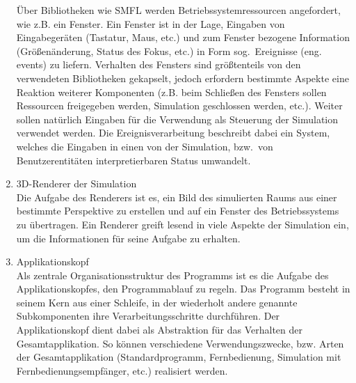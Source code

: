 \documentclass[11pt,twoside,a4paper]{article}
\begin{document}
\begin{enumerate}
Über Bibliotheken wie SMFL \cite{sfml} werden Betriebssystemressourcen angefordert, wie z.B. ein Fenster. Ein Fenster ist in der Lage, Eingaben von Eingabegeräten (Tastatur, Maus, etc.) und zum Fenster bezogene Information (Größenänderung, Status des Fokus, etc.) in Form sog.~Ereignisse (eng. events) zu liefern. Verhalten des Fensters sind größtenteils von den verwendeten Bibliotheken gekapselt, jedoch erfordern bestimmte Aspekte eine Reaktion weiterer Komponenten (z.B. beim Schließen des Fensters sollen Ressourcen freigegeben werden, Simulation geschlossen werden, etc.).
Weiter sollen natürlich Eingaben für die Verwendung als Steuerung der Simulation verwendet werden. Die Ereignisverarbeitung beschreibt dabei ein System, welches die Eingaben in einen von der Simulation, bzw.~von Benutzerentitäten interpretierbaren Status umwandelt.
\item 3D-Renderer der Simulation\\
Die Aufgabe des Renderers ist es, ein Bild des simulierten Raums aus einer bestimmte Perspektive zu erstellen und auf ein Fenster des Betriebssystems zu übertragen.
Ein Renderer greift lesend in viele Aspekte der Simulation ein, um die Informationen für seine Aufgabe zu erhalten.
\item Applikationskopf\\
Als zentrale Organisationsstruktur des Programms ist es die Aufgabe des Applikationskopfes, den Programmablauf zu regeln. Das Programm besteht in seinem Kern aus einer Schleife, in der wiederholt andere genannte Subkomponenten ihre Verarbeitungsschritte durchführen. Der Applikationskopf dient dabei als Abstraktion für das Verhalten der Gesamtapplikation. So können verschiedene Verwendungszwecke, bzw. Arten der Gesamtapplikation (Standardprogramm, Fernbedienung, Simulation mit Fernbedienungsempfänger, etc.) realisiert werden.
\end{enumerate}
\end{document}
